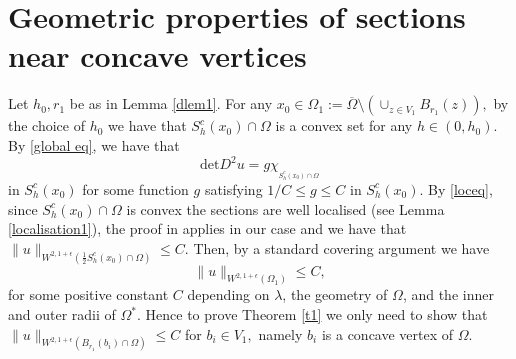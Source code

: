 \documentclass[11pt]{amsart}
\theoremstyle{plain}
\renewcommand{\det}{\mbox{det}}
\newcommand{\0}{\textbf{0}}
\numberwithin{equation}{section}
\numberwithin{equation}{section}
\numberwithin{figure}{section}
\begin{document}
	
	
	
	\section{Geometric properties of sections near concave vertices}
	
	Let $h_0, r_1$ be as in Lemma \ref{dlem1}. For any $x_0\in \Omega_1:=\overline{\Omega}\setminus\left(\cup_{z\in V_1}B_{r_1}(z)\right),$ by the choice of $h_0$ we have that 
	$S_h^c(x_0)\cap\Omega$ is a convex set for any $h\in (0, h_0).$ 
	By \eqref{global eq}, we have that 
	\begin{equation}\label{loceq}
		\det D^2u=g\chi_{_{S_h^c(x_0)\cap\Omega}}
	\end{equation}
	in 
	$S_h^c(x_0)$ for some function $g$ satisfying $1/C\leq g\leq C$ in $S_h^c(x_0).$
	By \eqref{loceq}, since $S_h^c(x_0)\cap\Omega$ is convex the sections are well localised
	(see Lemma \ref{localisation1}),  the proof in \cite{SY2} applies in our case and we have that
	$\|u\|_{W^{2,1+\epsilon}(\frac{1}{2}S_h^c(x_0)\cap\Omega)}\leq C.$ Then, by a standard covering argument we have
	\begin{equation}
		\|u\|_{W^{2,1+\epsilon}(\Omega_1)}\leq C,
	\end{equation}
	for some positive constant $C$ depending on $\lambda$, the geometry of $\Omega$, and the inner and outer radii of $\Omega^*$.
	Hence to prove Theorem \ref{t1} we only need to show that
	$\|u\|_{W^{2,1+\epsilon}(B_{r_1}(b_i)\cap \Omega)}\leq C$ for $b_i\in V_1,$ namely $b_i$ is a concave vertex of $\Omega.$
	
\end{document}
